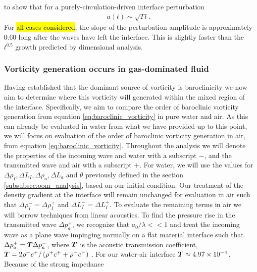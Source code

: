 to show that for a purely-circulation-driven interface perturbation
% 
\begin{align} \label{eq:intf_circ_scaling}
  a(t) \sim \sqrt{\Gamma t}.
\end{align}
% 
For \hl{all cases considered}, the slope of the perturbation amplitude
is approximately $0.60$ long after the waves have left the
interface. This is slightly faster than the $t^{0.5}$ growth predicted by
dimensional analysis. 
% 
% 
\subsubsection{Vorticity generation occurs in gas-dominated fluid}
Having established that the dominant source of vorticity is
baroclinicity we now aim to determine where this vorticity will
generated within the mixed region of the interface. Specifically, we
aim to compare the order of baroclinic vorticity generation from
equation \eqref{eq:baroclinic_vorticity} in pure water and air. As
this can already be evaluated in water from what we have provided up
to this point, we will focus on evaluation of the order of baroclinic
vorticity generation in air, from equation
\eqref{eq:baroclinic_vorticity}. Throughout the analysis we will
denote the properties of the incoming wave and water with a subscript
$-$, and the transmitted wave and air with a subscript $+$. For water,
we will use the values for
$\Delta \rho_I, \Delta L_I, \Delta \rho_a, \Delta L_a$ and $\theta$
previously defined in the section \ref{subsubsec:oom_analysis}, based
on our initial condition. Our treatment of the density gradient at the
interface will remain unchanged for evaluation in air such that
$\Delta \rho_I^-=\Delta \rho_I^+$ and $\Delta L_I^-=\Delta L_I^+$. To
evaluate the remaining terms in air we will borrow techniques from
linear acoustics. To find the pressure rise in the transmitted wave
$\Delta p_a^+$, we recognize that $a_0/\lambda<<1$ and treat the
incoming wave as a plane wave impinging normally on a flat material
interface such that $\Delta p_a^+=\boldsymbol{T} \Delta p_a^-$, where $\boldsymbol{T}$
is the acoustic transmission coefficient,
$\boldsymbol{T}=2\rho^+ c^+/\left(\rho^+ c^+ + \rho^- c^- \right)$
\citep{Kinsler1982}. For our water-air interface
$\boldsymbol{T}\approx4.97\times10^{-4}$. Because of the strong impedance
